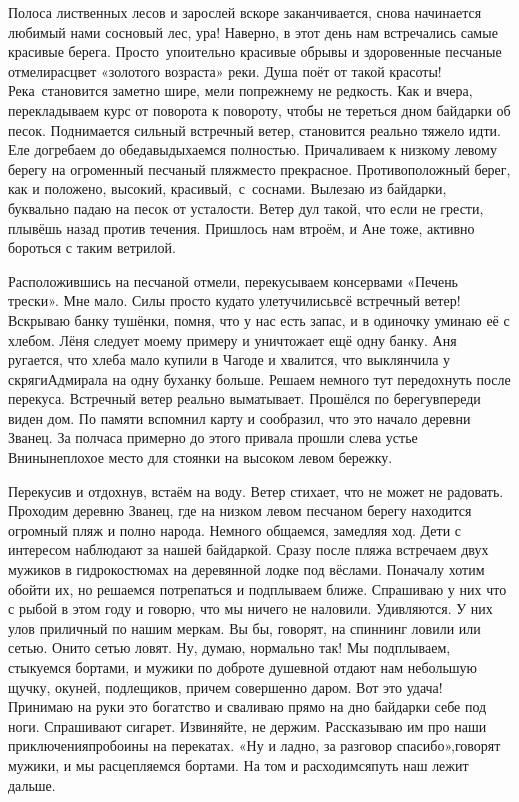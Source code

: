 Полоса лиственных лесов и зарослей вскоре заканчивается, снова начинается любимый нами сосновый лес, ура! Наверно, в этот день нам встречались самые красивые берега. Просто~упоительно красивые обрывы и здоровенные песчаные отмели\mdash расцвет «золотого возраста» реки. Душа поёт от такой красоты! Река~становится заметно шире, мели по\sdash прежнему не редкость. Как и вчера, перекладываем курс от поворота к повороту, чтобы не тереться дном байдарки об песок. Поднимается сильный встречный ветер, становится реально тяжело идти. Еле догребаем до обеда\mdash выдыхаемся полностью. Причаливаем к низкому левому берегу на огроменный песчаный пляж\mdash место прекрасное. Противоположный берег, как и положено, высокий, красивый,~с~соснами. Вылезаю из байдарки, буквально падаю на песок от усталости. Ветер дул такой, что если не грести, плывёшь назад против течения. Пришлось нам втроём, и Ане тоже, активно бороться с таким ветрилой. 

Расположившись на песчаной отмели, перекусываем консервами «Печень трески». Мне мало. Силы просто куда\sdash то улетучились\mdash всё встречный ветер! Вскрываю банку тушёнки, помня, что у нас есть запас, и в одиночку уминаю её с хлебом. Лёня следует моему примеру и уничтожает ещё одну банку. Аня ругается, что хлеба мало купили в Чагоде и хвалится, что выклянчила у скряги\sdash Адмирала на одну буханку больше. Решаем немного тут передохнуть после перекуса. Встречный ветер реально выматывает. Прошёлся по берегу\mdash впереди виден дом. По памяти вспомнил карту и сообразил, что это начало деревни Званец. За полчаса примерно до этого привала прошли слева устье Внины\mdash неплохое место для стоянки на высоком левом бережку. 

Перекусив и отдохнув, встаём на воду. Ветер стихает, что не может не радовать. Проходим деревню Званец, где на низком левом песчаном берегу находится огромный пляж и полно народа. Немного общаемся, замедляя ход. Дети с интересом наблюдают за нашей байдаркой. Сразу после пляжа встречаем двух мужиков в гидрокостюмах на деревянной лодке под вёслами. Поначалу хотим обойти их, но решаемся потрепаться и подплываем ближе. Спрашиваю у них что с рыбой в этом году и говорю, что мы ничего не наловили. Удивляются. У них улов приличный по нашим меркам. Вы бы, говорят, на спиннинг ловили или сетью. Они\sdash то сетью ловят. Ну, думаю, нормально так! Мы подплываем, стыкуемся бортами, и мужики по доброте душевной отдают нам небольшую щучку, окуней, подлещиков, причем совершенно даром. Вот это удача! Принимаю на руки это богатство и сваливаю прямо на дно байдарки себе под ноги. Спрашивают сигарет. Извиняйте, не держим. Рассказываю им про наши приключения\mdash пробоины на перекатах. «Ну и ладно, за разговор спасибо»,\mdash говорят мужики, и мы расцепляемся бортами. На том и расходимся\mdash путь наш лежит дальше.

